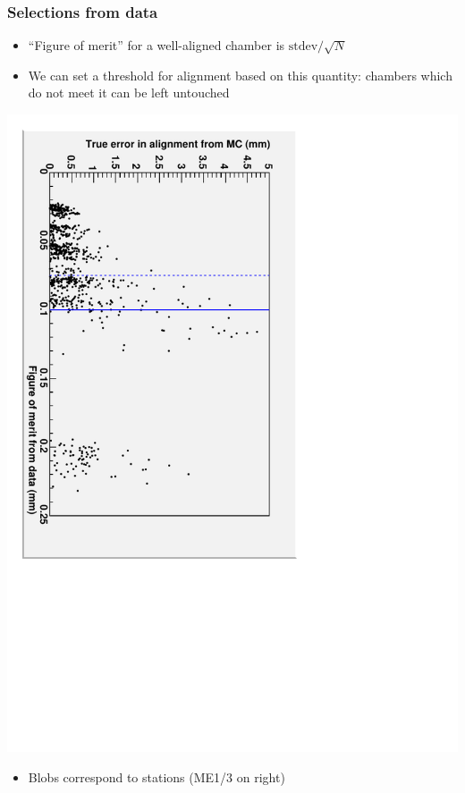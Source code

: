 \documentclass[compress]{beamer}
\begin{document}
\begin{frame}
\frametitle{Selections from data}

\begin{itemize}
\item ``Figure of merit'' for a well-aligned chamber is $\mbox{stdev}/\sqrt{N}$
\item We can set a threshold for alignment based on this quantity:
chambers which do not meet it can be left untouched
\end{itemize}

\vspace{-0.25 cm}
\begin{center}
\includegraphics[height=0.8\linewidth, angle=90]{correlation_idealtracker.pdf}
\end{center}

\vspace{-0.25 cm}
\begin{itemize}
\item Blobs correspond to stations (ME1/3 on right)
\end{itemize}
\end{frame}

\end{document}
